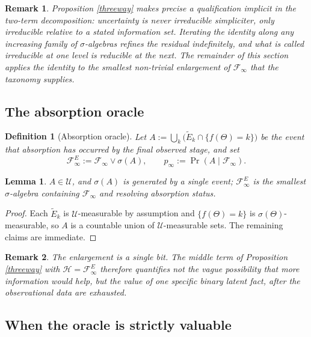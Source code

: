 \documentclass{article}
\newcommand{\F}{\mathcal{F}}
\newcommand{\U}{\mathcal{U}}
\newcommand{\1}{\mathbbm{1}}
\newtheorem{definition}{Definition}
\newtheorem{remark}{Remark}
\newtheorem{lemma}{Lemma}
\begin{document}
\begin{remark}
Proposition \ref{threeway} makes precise a qualification implicit in the two-term decomposition:
uncertainty is never irreducible \emph{simpliciter}, only irreducible relative to a stated
information set. Iterating the identity along any increasing family of $\sigma$-algebras refines
the residual indefinitely, and what is called irreducible at one level is reducible at the next.
The remainder of this section applies the identity to the smallest non-trivial enlargement of
$\F_\infty$ that the taxonomy supplies.
\end{remark}

\subsection*{The absorption oracle}

\begin{definition}[Absorption oracle]
\label{oracledef}
Let $A:=\bigcup_{k}\big(\widetilde E_k\cap\{f(\Theta)=k\}\big)$ be the event that absorption has
occurred by the final observed stage, and set
\[
\F^E_\infty:=\F_\infty\vee\sigma(A),\qquad p_\infty:=\Pr(A\mid\F_\infty).
\]
\end{definition}

\begin{lemma}
\label{oraclewelldef}
$A\in\U$, and $\sigma(A)$ is generated by a single event; $\F^E_\infty$ is the smallest
$\sigma$-algebra containing $\F_\infty$ and resolving absorption status.
\end{lemma}

\begin{proof}
Each $\widetilde E_k$ is $\U$-measurable by assumption and $\{f(\Theta)=k\}$ is
$\sigma(\Theta)$-measurable, so $A$ is a countable union of $\U$-measurable sets. The remaining
claims are immediate.
\end{proof}

\begin{remark}
The enlargement is a single bit. The middle term of Proposition \ref{threeway} with
$\mathcal{H}=\F^E_\infty$ therefore quantifies not the vague possibility that more information
would help, but the value of one specific binary latent fact, after the observational data are
exhausted.
\end{remark}

\subsection*{When the oracle is strictly valuable}
\end{document}
